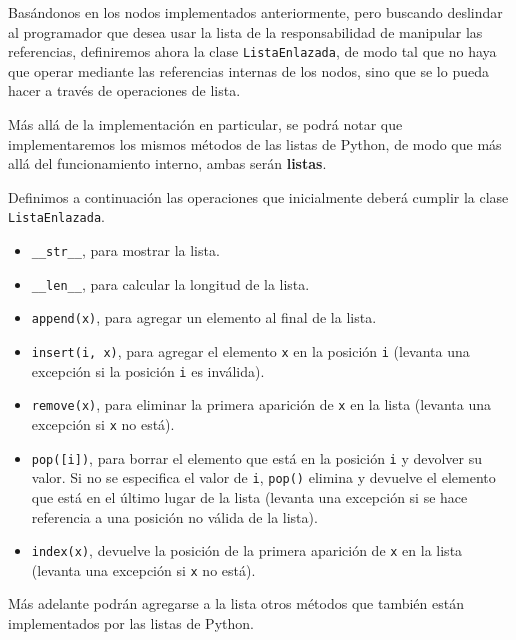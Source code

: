Basándonos en los nodos implementados anteriormente, pero buscando
deslindar al programador que desea usar la lista de la responsabilidad de
manipular las referencias, definiremos ahora la clase
\lstinline!ListaEnlazada!, de modo tal que no haya que operar mediante las
referencias internas de los nodos, sino que se lo pueda hacer a través de
operaciones de lista.

Más allá de la implementación en particular, se podrá notar que implementaremos
los mismos métodos de las listas de Python, de modo que más allá del
funcionamiento interno, ambas serán {\bf listas}.

Definimos a continuación las operaciones que inicialmente deberá cumplir la
clase \lstinline!ListaEnlazada!.

\begin{itemize}
\item \lstinline|__str__|, para mostrar la lista.

\item \lstinline|__len__|, para calcular la longitud de la lista.

\item \lstinline|append(x)|, para agregar un elemento al final de la lista.

\item \lstinline|insert(i, x)|, para agregar el elemento \lstinline!x! en la
posición \lstinline!i! (levanta una excepción si la posición \lstinline!i! es
inválida).

\item \lstinline|remove(x)|, para eliminar la primera aparición de
\lstinline!x! en la lista (levanta una excepción si \lstinline!x! no está).

\item \lstinline|pop([i])|, para borrar el elemento que está en la posición
\lstinline!i! y devolver su valor. Si no se especifica el valor de
\lstinline!i!, \lstinline|pop()| elimina y devuelve el elemento que está en
el último lugar de la lista (levanta una excepción si se hace referencia a
una posición no válida de la lista).

\item \lstinline|index(x)|, devuelve la posición de la primera aparición de
\lstinline!x! en la lista (levanta una excepción si \lstinline!x! no está).
\end{itemize}

Más adelante podrán agregarse a la lista otros métodos que también están
implementados por las listas de Python.

